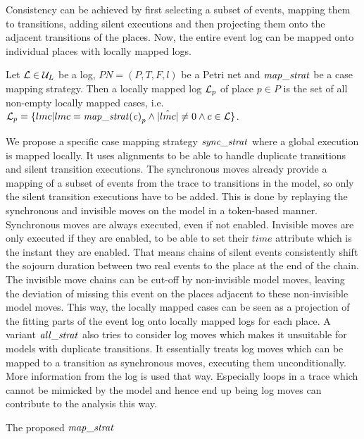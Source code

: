 Consistency can be achieved by first selecting a subset of events, mapping them to transitions, adding silent executions and then projecting them onto the adjacent transitions of the places.
Now, the entire event log can be mapped onto individual places with locally mapped logs.
\begin{definition}
Let $\mathcal{L} \in \mathcal{U}_L$ be a log, $PN = (P,T,F,l)$ be a Petri net and $\mathit{map\_strat}$ be a case mapping strategy. Then a locally mapped log $\mathcal{L}_p$ of place $p\in P$ is the set of all non-empty locally mapped cases, i.e. $\mathcal{L}_p=\{lmc|lmc = \mathit{map\_strat(c)}_p \wedge |\hat{lmc}|\neq 0 \wedge c \in \mathcal{L} \}$.
\end{definition}

We propose a specific case mapping strategy $\mathit{sync\_strat}$ where a global execution is mapped locally. It uses alignments to be able to handle duplicate transitions and silent transition executions. 
The synchronous moves already provide a mapping of a subset of events from the trace to transitions in the model, so only the silent transition executions have to be added. This is done by replaying the synchronous and invisible moves on the model in a token-based manner. Synchronous moves are always executed, even if not enabled. Invisible moves are only executed if they are enabled, to be able to set their $time$ attribute which is the instant they are enabled. That means chains of silent events consistently shift the sojourn duration between two real events to the place at the end of the chain. The invisible move chains can be cut-off by non-invisible model moves, leaving the deviation of missing this event on the places adjacent to these non-invisible model moves.
This way, the locally mapped cases can be seen as a projection of the fitting parts of the event log onto locally mapped logs for each place.
A variant $\mathit{all\_strat}$ also tries to consider log moves which makes it unsuitable for models with duplicate transitions. It essentially treats log moves which can be mapped to a transition as synchronous moves, executing them unconditionally. More information from the log is used that way. Especially loops in a trace which cannot be mimicked by the model and hence end up being log moves can contribute to the analysis this way.

\begin{algorithm}[tb]

\caption{The proposed $\mathit{map\_strat}$}
\label{alg:mapstrat}
\end{algorithm}

